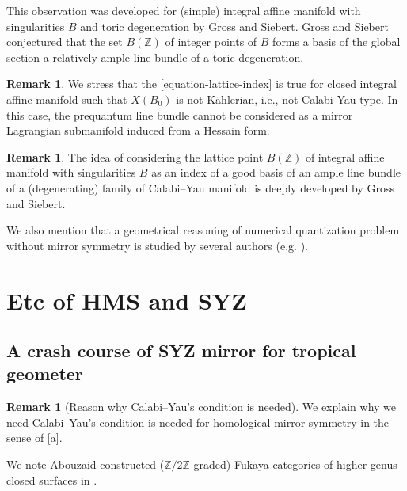 \documentclass[a4paper,dvipdfmx,reqno,12pt]{amsart}
\theoremstyle{definition}
\newtheorem{remark}[theorem]{Remark}
\newcommand{\Z}{\mathbb{Z}}%
\numberwithin{equation}{section}
\begin{document}
This observation was developed for 
(simple) integral affine manifold with singularities
$B$
and toric degeneration by Gross and Siebert. 
Gross and Siebert conjectured 
that the set $B(\mathbb{Z})$ of integer points of 
$B$ forms a basis of the global section a 
relatively ample line bundle of a toric degeneration.


\begin{remark}
We stress that the \cref{equation-lattice-index} is 
true for closed integral affine manifold 
such that $X(B_0)$ is not K\"ahlerian, i.e., 
not Calabi-Yau type.
In this case,
the prequantum line bundle cannot be considered as
a mirror Lagrangian submanifold induced from a Hessain
form.
\end{remark}



\begin{remark}

The idea of considering the lattice point 
$B(\mathbb{Z})$ of 
integral affine manifold with singularities $B$ as 
an index of a good basis of an ample line bundle of 
a (degenerating) family of Calabi--Yau manifold is 
deeply developed by Gross and Siebert. 




We also mention that a geometrical reasoning 
of numerical quantization problem without
mirror symmetry is studied by several authors 
(e.g. \cite{MR2879247,
https://doi.org/10.48550/arxiv.1904.04076}).
\end{remark}



\section{Etc of HMS and SYZ}

\subsection{A crash course of SYZ mirror for tropical 
geometer}

\begin{remark}[{Reason why Calabi--Yau's condition is needed}]

We explain why we need Calabi--Yau's condition is needed for
homological mirror symmetry in the sense of \cref{a}.

We note Abouzaid constructed ($\Z/2\Z$-graded)
Fukaya categories of higher genus closed surfaces in
\cite{MR2383898}. 
\end{remark}
\end{document}
